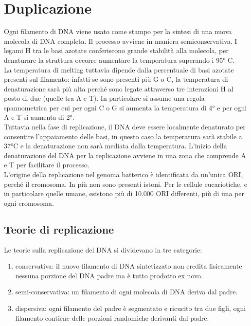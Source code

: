 \section{Duplicazione}
    Ogni filamento di DNA viene usato come stampo per la sintesi di una nuova molecola di DNA completa. Il processo avviene in maniera semiconservativa. I legami H tra le basi azotate conferiscono grande stabilità alla molecola, per denaturare la struttura occorre aumentare la temperatura superando i 95° C. \\
    La temperatura di melting tuttavia dipende dalla percentuale di basi azotate presenti sul filamento: infatti se sono presenti più G o C, la temperatura di denaturazione sarà più alta perché sono legate attraverso tre interazioni H al posto di due (quelle tra A e T). 
    In particolare si assume una regola spannometrica per cui per ogni C o G si aumenta la temperatura di 4° e per ogni A e T si aumenta di 2°.\\
    Tuttavia nella fase di replicazione, il DNA deve essere localmente denaturato per consentire l'appaiamento delle basi, in questo caso la temperatura sarà stabile a 37°C e la denaturazione non sarà mediata dalla temperatura.
    L'inizio della denaturazione del DNA per la replicazione avviene in una zona che comprende A e T per facilitare il processo.\\
    L'origine della replicazione nel genoma batterico è identificata da un'unica ORI, perché il cromosoma. In più non sono presenti istoni.
    Per le cellule eucariotiche, e in particolare quelle umane, esistono più di 10.000 ORI differenti, più di una per ogni cromosoma.
    
    \subsection{Teorie di replicazione}
        Le teorie sulla replicazione del DNA si dividevano in tre categorie:
        \begin{enumerate}
            \item conservativa: il nuovo filamento di DNA sintetizzato non eredita fisicamente nessuna porzione del DNA padre ma è tutto prodotto ex novo.
            \item semi-conservativa: un filamento di ogni molecola di DNA deriva dal padre.
            \item dispersiva: ogni filamento del padre è segmentato e ricucito tra due figli, ogni filamento contiene delle porzioni randomiche derivanti dal padre.
        \end{enumerate}
